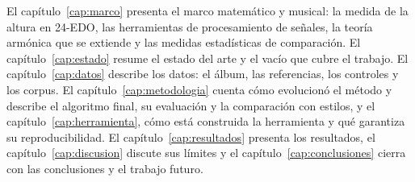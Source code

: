 El capítulo~\ref{cap:marco} presenta el marco matemático y musical: la medida de la altura en 24-EDO, las herramientas de
procesamiento de señales, la teoría armónica que se extiende y las medidas estadísticas de comparación. El
capítulo~\ref{cap:estado} resume el estado del arte y el vacío que cubre el trabajo. El capítulo~\ref{cap:datos}
describe los datos: el álbum, las referencias, los controles y los corpus. El capítulo~\ref{cap:metodologia} cuenta
cómo evolucionó el método y describe el algoritmo final, su evaluación y la comparación con estilos, y el
capítulo~\ref{cap:herramienta}, cómo está construida la herramienta y qué garantiza su reproducibilidad. El
capítulo~\ref{cap:resultados} presenta los resultados, el capítulo~\ref{cap:discusion} discute sus límites y el
capítulo~\ref{cap:conclusiones} cierra con las conclusiones y el trabajo futuro.
